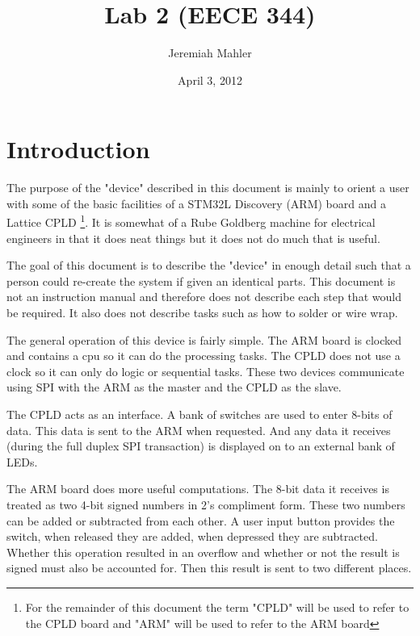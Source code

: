 \documentclass{article}
\begin{document}

\title{Lab 2 (EECE 344)}
\date{April 3, 2012}
\author{Jeremiah Mahler}

\maketitle

\tableofcontents

\pagebreak

\section{Introduction}

The purpose of the "device" described in this document is mainly
to orient a user with some of the basic facilities of a STM32L Discovery\citep{UM1079}
(ARM) board and a Lattice CPLD\cite{EB66}
\footnote{For the remainder of this document the term "CPLD" will
be used to refer to the CPLD board and "ARM" will be used to
refer to the ARM board}.
It is somewhat of a Rube Goldberg machine for electrical engineers
in that it does neat things but it does not do much that is useful.

The goal of this document is to describe the "device" in enough
detail such that a person could re-create the system if given
an identical parts.
This document is not an instruction manual and therefore does not
describe each step that would be required.
It also does not describe tasks such as how to solder or wire wrap.

The general operation of this device is fairly simple.
The ARM board is clocked and contains a cpu so it can do the processing
tasks.
The CPLD does not use a clock so it can only do logic or sequential tasks.
These two devices communicate using SPI with the ARM as the master and
the CPLD as the slave.

The CPLD acts as an interface.
A bank of switches are used to enter 8-bits of data.
This data is sent to the ARM when requested.
And any data it receives (during the full duplex SPI transaction)
is displayed on to an external bank of LEDs.

The ARM board does more useful computations.
The 8-bit data it receives is treated as two 4-bit signed numbers
in 2's compliment form.
These two numbers can be added or subtracted from each other.
A user input button provides the switch, when released they are
added, when depressed they are subtracted.
Whether this operation resulted in an overflow and whether or
not the result is signed must also be accounted for.
Then this result is sent to two different places.
\end{document}
